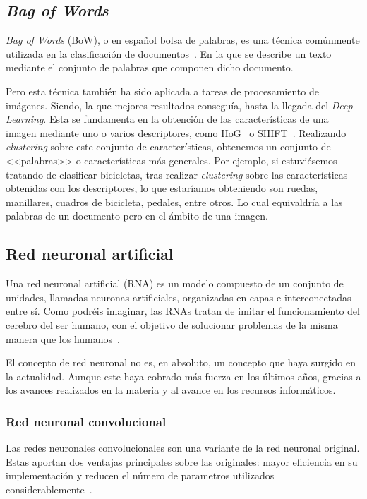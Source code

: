 \subsection{\textit{Bag of Words}}

\textit{Bag of Words} (BoW), o en español bolsa de palabras, es una técnica comúnmente utilizada en la clasificación de documentos~\cite{wiki:bowmodel}. En la que se describe un texto mediante el conjunto de palabras que componen dicho documento.

Pero esta técnica también ha sido aplicada a tareas de procesamiento de imágenes. Siendo, la que mejores resultados conseguía, hasta la llegada del \textit{Deep Learning}. Esta se fundamenta en la obtención de las características de una imagen mediante uno o varios descriptores, como HoG~\cite{wiki:hog} o SHIFT~\cite{shift}. Realizando \textit{clustering} sobre este conjunto de características, obtenemos un conjunto de <<palabras>> o características más generales. Por ejemplo, si estuviésemos tratando de  clasificar bicicletas, tras realizar \textit{clustering} sobre las características obtenidas con los descriptores, lo que estaríamos obteniendo son ruedas, manillares, cuadros de bicicleta, pedales, entre otros. Lo cual equivaldría a las palabras de un documento pero en el ámbito de una imagen.

\subsection{Red neuronal artificial}

Una red neuronal artificial (RNA) es un modelo compuesto de un conjunto de unidades, llamadas neuronas artificiales, organizadas en capas e interconectadas entre sí. Como podréis imaginar, las RNAs tratan de imitar el funcionamiento del cerebro del ser humano, con el objetivo de solucionar problemas de la misma manera que los humanos~\cite{wiki:ann}.

El concepto de red neuronal no es, en absoluto, un concepto que haya surgido en la actualidad. Aunque este haya cobrado más fuerza en los últimos años, gracias a los avances realizados en la materia y al avance en los recursos informáticos.

\subsubsection{Red neuronal convolucional}

Las redes neuronales convolucionales son una variante de la red neuronal original. Estas aportan dos ventajas principales sobre las originales: mayor eficiencia en su implementación y reducen el número de parametros utilizados considerablemente~\cite{cnn}.

